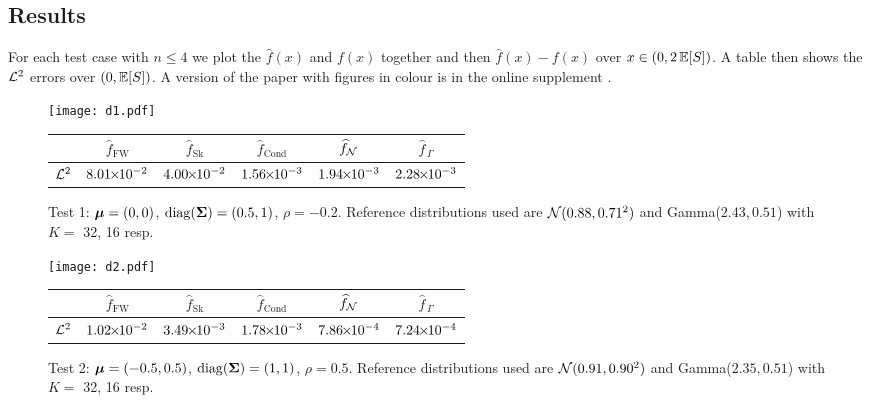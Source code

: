 

\subsection{Results}

For each test case with $n \le 4$ we plot the $\widehat{f}(x)$ and $f(x)$ together and then $\widehat{f}(x)-f(x)$ over $x \in (0, 2\operatorname{{\mathbb E}}[S])$. A table then shows the $\mathcal{L}^2$ errors over $(0, \operatorname{{\mathbb E}}[S])$. A version of the paper
with figures in colour is in the online supplement \cite{Code}.
\setlength\extrarowheight{3pt}

\begin{figure}[H]
\centering
\texttt{[image: d1.pdf]}

\vspace{4mm}

\begin{tabular}{c|c|c|c|c|c|}
\cline{2-6}
                         & $\widehat{f}_{\mathrm{FW}}$  & $\widehat{f}_{\mathrm{Sk}}$ & $\widehat{f}_{\mathrm{Cond}}$ & $\widehat{f}_{\mathcal{N}}$  & $\widehat{f}_{\,\Gamma}$ \\ \hline
\multicolumn{1}{|c|}{$\mathcal{L}^2$} & $8.01 {\mkern-2mu\times\mkern-2mu} 10^{-2}$ & $4.00 {\mkern-2mu\times\mkern-2mu} 10^{-2}$ & $1.56 {\mkern-2mu\times\mkern-2mu} 10^{-3}$ & $1.94 {\mkern-2mu\times\mkern-2mu} 10^{-3}$ & $2.28 {\mkern-2mu\times\mkern-2mu} 10^{-3}$ \\  \hline
\end{tabular}
\caption*{Test 1: $\bm{\mu} = (0, 0)$, $\mathrm{diag}(\bm{\Sigma}) = (0.5, 1)$, $\rho = -0.2$. Reference distributions used are $\mathcal{N}(0.88,0.71^2)$ and Gamma($2.43,0.51$) with $K =$ 32, 16 resp.}
\end{figure}




\begin{figure}[H]
\centering
\texttt{[image: d2.pdf]}

\vspace{4mm}

\begin{tabular}{c|c|c|c|c|c|}
\cline{2-6}
                         & $\widehat{f}_{\mathrm{FW}}$  & $\widehat{f}_{\mathrm{Sk}}$ & $\widehat{f}_{\mathrm{Cond}}$ & $\widehat{f}_{\mathcal{N}}$  & $\widehat{f}_{\,\Gamma}$ \\ \hline
\multicolumn{1}{|c|}{$\mathcal{L}^2$} & $1.02 {\mkern-2mu\times\mkern-2mu} 10^{-2}$ & $3.49 {\mkern-2mu\times\mkern-2mu} 10^{-3}$ & $1.78 {\mkern-2mu\times\mkern-2mu} 10^{-3}$ & $7.86 {\mkern-2mu\times\mkern-2mu} 10^{-4}$ & $7.24 {\mkern-2mu\times\mkern-2mu} 10^{-4}$ \\ \hline
\end{tabular}
\caption*{Test 2: $\bm{\mu} = (-0.5, 0.5)$, $\mathrm{diag}(\bm{\Sigma})= (1,1)$, $\rho = 0.5$. Reference distributions used are $\mathcal{N}(0.91,0.90^2)$ and Gamma($2.35,0.51$) with $K =$ 32, 16 resp.}
\end{figure}

